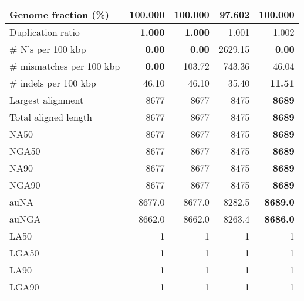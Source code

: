 \documentclass[12pt,a4paper]{article}
\begin{document}
\begin{table}[ht]
\begin{center}
\begin{tabular}{|l*{4}{|r}|}
Genome fraction (\%) & {\bf 100.000} & {\bf 100.000} & 97.602 & {\bf 100.000} \\ \hline
Duplication ratio & {\bf 1.000} & {\bf 1.000} & 1.001 & 1.002 \\ \hline
\# N's per 100 kbp & {\bf 0.00} & {\bf 0.00} & 2629.15 & {\bf 0.00} \\ \hline
\# mismatches per 100 kbp & {\bf 0.00} & 103.72 & 743.36 & 46.04 \\ \hline
\# indels per 100 kbp & 46.10 & 46.10 & 35.40 & {\bf 11.51} \\ \hline
Largest alignment & 8677 & 8677 & 8475 & {\bf 8689} \\ \hline
Total aligned length & 8677 & 8677 & 8475 & {\bf 8689} \\ \hline
NA50 & 8677 & 8677 & 8475 & {\bf 8689} \\ \hline
NGA50 & 8677 & 8677 & 8475 & {\bf 8689} \\ \hline
NA90 & 8677 & 8677 & 8475 & {\bf 8689} \\ \hline
NGA90 & 8677 & 8677 & 8475 & {\bf 8689} \\ \hline
auNA & 8677.0 & 8677.0 & 8282.5 & {\bf 8689.0} \\ \hline
auNGA & 8662.0 & 8662.0 & 8263.4 & {\bf 8686.0} \\ \hline
LA50 & 1 & 1 & 1 & 1 \\ \hline
LGA50 & 1 & 1 & 1 & 1 \\ \hline
LA90 & 1 & 1 & 1 & 1 \\ \hline
LGA90 & 1 & 1 & 1 & 1 \\ \hline
\end{tabular}
\end{center}
\end{table}
\end{document}
